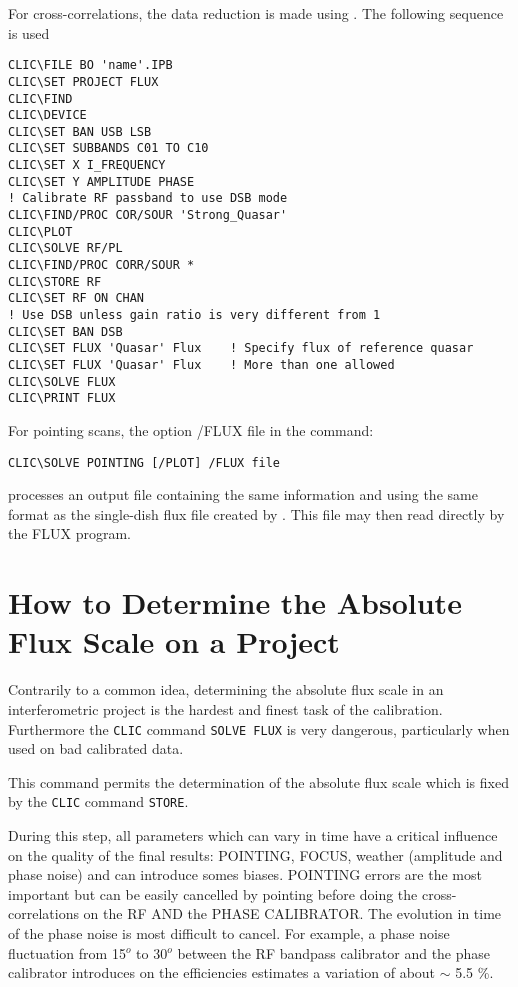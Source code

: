\documentclass[11pt]{article}
\begin{document}
For cross-correlations, the data reduction is made using \clic . The
following sequence is used
\begin{verbatim}
CLIC\FILE BO 'name'.IPB
CLIC\SET PROJECT FLUX
CLIC\FIND
CLIC\DEVICE
CLIC\SET BAN USB LSB
CLIC\SET SUBBANDS C01 TO C10
CLIC\SET X I_FREQUENCY
CLIC\SET Y AMPLITUDE PHASE
! Calibrate RF passband to use DSB mode
CLIC\FIND/PROC COR/SOUR 'Strong_Quasar'
CLIC\PLOT
CLIC\SOLVE RF/PL
CLIC\FIND/PROC CORR/SOUR *
CLIC\STORE RF
CLIC\SET RF ON CHAN
! Use DSB unless gain ratio is very different from 1
CLIC\SET BAN DSB
CLIC\SET FLUX 'Quasar' Flux    ! Specify flux of reference quasar
CLIC\SET FLUX 'Quasar' Flux    ! More than one allowed
CLIC\SOLVE FLUX
CLIC\PRINT FLUX
\end{verbatim} 

For pointing scans, the option /FLUX file in the command:
\begin{verbatim}
CLIC\SOLVE POINTING [/PLOT] /FLUX file
\end{verbatim}
processes an output file containing the same information and using the same
format as the single-dish flux file created by \class .  This file may then
read directly by the FLUX program.

\section{How to Determine the Absolute Flux Scale on a Project}

Contrarily to a common idea, determining the absolute flux scale in an
interferometric project is the hardest and finest task of the calibration.
Furthermore the {\tt CLIC} command {\tt SOLVE FLUX} is very dangerous,
particularly when used on bad calibrated data.

This command permits the determination of the absolute flux scale which is
fixed by the {\tt CLIC} command {\tt STORE}.

During this step, all parameters which can vary in time have a critical
influence on the quality of the final results: POINTING, FOCUS, weather
(amplitude and phase noise) and can introduce somes biases. POINTING errors
are the most important but can be easily cancelled by pointing before doing
the cross-correlations on the RF AND the PHASE CALIBRATOR. The evolution in
time of the phase noise is most difficult to cancel.  For example, a phase
noise fluctuation from 15$^o$ to 30$^o$ between the RF bandpass calibrator
and the phase calibrator introduces on the efficiencies estimates a
variation of about $\sim$ 5.5 \%.
\end{document}
